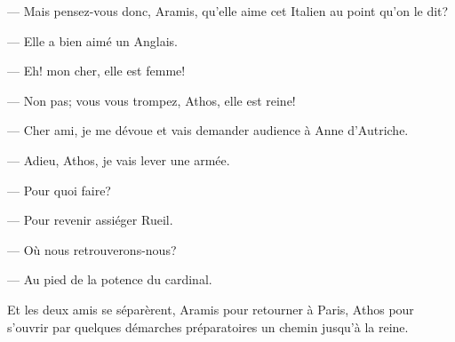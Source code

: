 — Mais pensez-vous donc, Aramis, qu'elle aime cet Italien au point qu'on le dit?

— Elle a bien aimé un Anglais.

— Eh! mon cher, elle est femme!

— Non pas; vous vous trompez, Athos, elle est reine!

— Cher ami, je me dévoue et vais demander audience à Anne d'Autriche.

— Adieu, Athos, je vais lever une armée.

— Pour quoi faire?

— Pour revenir assiéger Rueil.

— Où nous retrouverons-nous?

— Au pied de la potence du cardinal.

Et les deux amis se séparèrent, Aramis pour retourner à Paris, Athos pour s'ouvrir par quelques démarches préparatoires un chemin jusqu'à la reine.